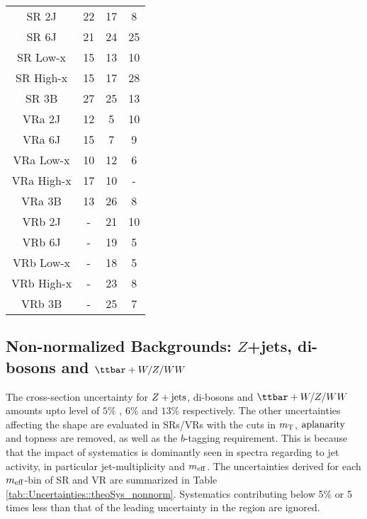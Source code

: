 \begin{table}[h]
\begin{subtable}{.5\linewidth}
\begin{tabular}{ c | c c c }
            \hline
            \hline
            SR 2J  &  22 & 17 & 8 \\
            SR 6J  &  21 & 24 & 25 \\
            SR Low-x  &  15 & 13 & 10 \\
            SR High-x  &  15 & 17 & 28 \\
            SR 3B  &  27 & 25 & 13 \\
            \hline
            VRa 2J  &  12 & 5 & 10 \\
            VRa 6J  &  15 & 7 & 9 \\
            VRa Low-x  &  10 & 12 & 6 \\
            VRa High-x  &  17 & 10 & - \\
            VRa 3B  &  13 & 26 & 8 \\
            \hline
            VRb 2J  &  - & 21 & 10 \\
            VRb 6J  &  - & 19 & 5 \\
            VRb Low-x  &  - & 18 & 5 \\
            VRb High-x  &  - & 23 & 8 \\
            VRb 3B  &  - & 25 & 7 \\
            \hline            
        \end{tabular}
        \label{tab::Uncertainties::theoSys_Tops}
    \end{subtable} 
\end{table}


\clearpage
\subsection{Non-normalized Backgrounds: $Z$+jets, di-bosons and $\ttbar+W/Z/WW$}  
The cross-section uncertainty for $Z+\mathrm{jets}$, di-bosons and $\ttbar+W/Z/WW$ amounts upto level of $5\%$ \cite{VjetsXsecMeas_ATLAS_Run1}, $6\%$ \cite{ATL-PHYS-PUB-2016-002} and $13\%$ \cite{Alwall:2014hca} respectively. 
The other uncertainties affecting the shape are evaluated in SRs/VRs with the cuts in $m_{\mathrm{T}}$, $\mathrm{aplanarity}$ and topness are removed, as well as the $b$-tagging requirement.
This is because that the impact of systematics is dominantly seen in spectra regarding to jet activity, in particular jet-multiplicity and $m_{\mathrm{eff}}$. 
The uncertainties derived for each $m_{\mathrm{eff}}$-bin of SR and VR are summarized in Table \ref{tab::Uncertainties::theoSys_nonnorm}. 
Systematics contributing below 5$\%$ or 5 times less than that of the leading uncertainty in the region are ignored.  \\

